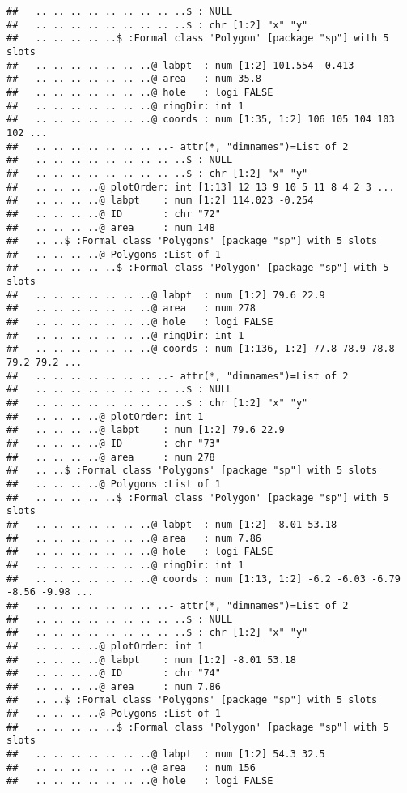 \documentclass[]{article}
\begin{document}
\begin{verbatim}
##   .. .. .. .. .. .. .. .. ..$ : NULL
##   .. .. .. .. .. .. .. .. ..$ : chr [1:2] "x" "y"
##   .. .. .. .. ..$ :Formal class 'Polygon' [package "sp"] with 5 slots
##   .. .. .. .. .. .. ..@ labpt  : num [1:2] 101.554 -0.413
##   .. .. .. .. .. .. ..@ area   : num 35.8
##   .. .. .. .. .. .. ..@ hole   : logi FALSE
##   .. .. .. .. .. .. ..@ ringDir: int 1
##   .. .. .. .. .. .. ..@ coords : num [1:35, 1:2] 106 105 104 103 102 ...
##   .. .. .. .. .. .. .. ..- attr(*, "dimnames")=List of 2
##   .. .. .. .. .. .. .. .. ..$ : NULL
##   .. .. .. .. .. .. .. .. ..$ : chr [1:2] "x" "y"
##   .. .. .. ..@ plotOrder: int [1:13] 12 13 9 10 5 11 8 4 2 3 ...
##   .. .. .. ..@ labpt    : num [1:2] 114.023 -0.254
##   .. .. .. ..@ ID       : chr "72"
##   .. .. .. ..@ area     : num 148
##   .. ..$ :Formal class 'Polygons' [package "sp"] with 5 slots
##   .. .. .. ..@ Polygons :List of 1
##   .. .. .. .. ..$ :Formal class 'Polygon' [package "sp"] with 5 slots
##   .. .. .. .. .. .. ..@ labpt  : num [1:2] 79.6 22.9
##   .. .. .. .. .. .. ..@ area   : num 278
##   .. .. .. .. .. .. ..@ hole   : logi FALSE
##   .. .. .. .. .. .. ..@ ringDir: int 1
##   .. .. .. .. .. .. ..@ coords : num [1:136, 1:2] 77.8 78.9 78.8 79.2 79.2 ...
##   .. .. .. .. .. .. .. ..- attr(*, "dimnames")=List of 2
##   .. .. .. .. .. .. .. .. ..$ : NULL
##   .. .. .. .. .. .. .. .. ..$ : chr [1:2] "x" "y"
##   .. .. .. ..@ plotOrder: int 1
##   .. .. .. ..@ labpt    : num [1:2] 79.6 22.9
##   .. .. .. ..@ ID       : chr "73"
##   .. .. .. ..@ area     : num 278
##   .. ..$ :Formal class 'Polygons' [package "sp"] with 5 slots
##   .. .. .. ..@ Polygons :List of 1
##   .. .. .. .. ..$ :Formal class 'Polygon' [package "sp"] with 5 slots
##   .. .. .. .. .. .. ..@ labpt  : num [1:2] -8.01 53.18
##   .. .. .. .. .. .. ..@ area   : num 7.86
##   .. .. .. .. .. .. ..@ hole   : logi FALSE
##   .. .. .. .. .. .. ..@ ringDir: int 1
##   .. .. .. .. .. .. ..@ coords : num [1:13, 1:2] -6.2 -6.03 -6.79 -8.56 -9.98 ...
##   .. .. .. .. .. .. .. ..- attr(*, "dimnames")=List of 2
##   .. .. .. .. .. .. .. .. ..$ : NULL
##   .. .. .. .. .. .. .. .. ..$ : chr [1:2] "x" "y"
##   .. .. .. ..@ plotOrder: int 1
##   .. .. .. ..@ labpt    : num [1:2] -8.01 53.18
##   .. .. .. ..@ ID       : chr "74"
##   .. .. .. ..@ area     : num 7.86
##   .. ..$ :Formal class 'Polygons' [package "sp"] with 5 slots
##   .. .. .. ..@ Polygons :List of 1
##   .. .. .. .. ..$ :Formal class 'Polygon' [package "sp"] with 5 slots
##   .. .. .. .. .. .. ..@ labpt  : num [1:2] 54.3 32.5
##   .. .. .. .. .. .. ..@ area   : num 156
##   .. .. .. .. .. .. ..@ hole   : logi FALSE

\end{verbatim}
\end{document}
